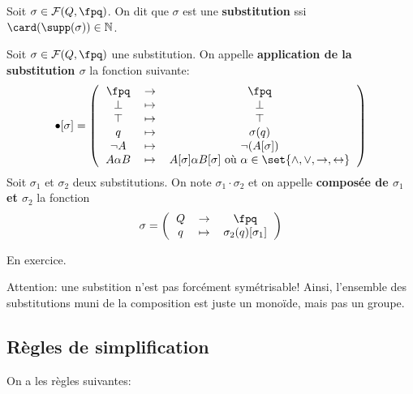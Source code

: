 \documentclass{scrartcl}
\begin{document}
			 Soit $\sigma \in \mathcal{F}(Q,\fpq)$. On dit que $\sigma$ est une \textbf{substitution} ssi $\card(\supp(\sigma)) \in \mathbb{N}$.

			 Soit $\sigma \in \mathcal{F}(Q,\fpq)$ une substitution. 
			On appelle \textbf{application de la substitution $\sigma$} la fonction suivante:
			\[
				\bullet[\sigma] = 
				\left(\begin{tabular}{c c c}
					$\fpq$ & $\rightarrow$ & $\fpq$ \\
					$\bot$ & $\mapsto$ & $\bot$ \\
					$\top$ & $\mapsto$ & $\top$ \\
					$q$ & $\mapsto$ & $\sigma(q)$ \\
					$\neg A$ & $\mapsto$ & $\neg (A[\sigma])$ \\
					$A \alpha B$ & $\mapsto$ & $A[\sigma] \alpha B[\sigma]$ où $\alpha \in \set{\wedge,\vee,\rightarrow,\leftrightarrow}$
				\end{tabular}\right)
			\]
			Soit $\sigma_1$ et $\sigma_2$ deux substitutions. 
			On note $\sigma_1\cdot\sigma_2$ et on appelle \textbf{composée de $\sigma_1$ et $\sigma_2$} la fonction
			\[\sigma=\left(\begin{tabular}{c c c }
			$Q$ & $\rightarrow$ & $\fpq$ \\
			$q$ & $\mapsto$ & $\sigma_2(q)[\sigma_1]$
			\end{tabular}\right)\]

			\begin{demo}
				\item En exercice.
			\end{demo}
			
			\rem Attention: une substition n'est pas forcément symétrisable! 
			Ainsi, l'ensemble des substitutions muni de la composition est juste un monoïde, mais pas un groupe. 

		\subsection{Règles de simplification}
			On a les règles suivantes:
			
\end{document}
